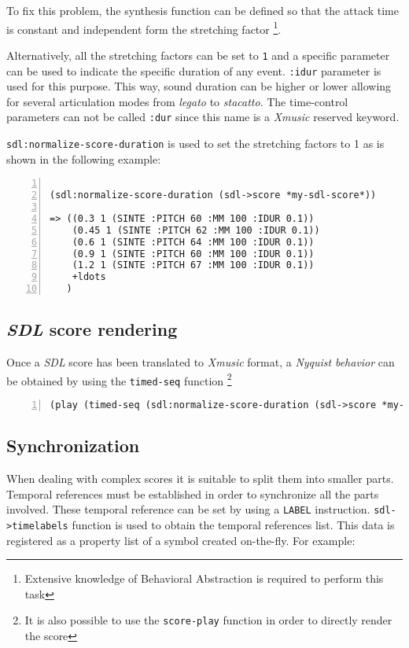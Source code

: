 To fix this problem, the synthesis function can be defined so that the
attack time is constant and independent form the stretching factor
\footnote{Extensive knowledge of Behavioral Abstraction is required to
  perform this task}.

Alternatively, all the stretching factors can be set to \texttt{1} and
a specific parameter can be used to indicate the specific duration of
any event. \texttt{:idur} parameter is used for this purpose. This
way, sound duration can be higher or lower allowing for several
articulation modes from {\it legato} to {\it stacatto}. The time-control
parameters can not be called \texttt{:dur} since this name is a {\it
  Xmusic} reserved keyword.




\texttt{sdl:normalize-score-duration} is used to set the stretching
factors to 1 as is shown in the following example:
\begin{Verbatim}[frame=single,fontsize=\small,numbers=left,numbersep=2mm,
                 commandchars=+\[\]]

(sdl:normalize-score-duration (sdl->score *my-sdl-score*))

=> ((0.3 1 (SINTE :PITCH 60 :MM 100 :IDUR 0.1))
    (0.45 1 (SINTE :PITCH 62 :MM 100 :IDUR 0.1))
    (0.6 1 (SINTE :PITCH 64 :MM 100 :IDUR 0.1))
    (0.9 1 (SINTE :PITCH 60 :MM 100 :IDUR 0.1))
    (1.2 1 (SINTE :PITCH 67 :MM 100 :IDUR 0.1))
    +ldots
   )
\end{Verbatim}
  
\subsection{\textit{SDL} score rendering}
Once a \textit{SDL} score has been translated to \textit{Xmusic}
format, a {\it Nyquist} {\it behavior} can be obtained by using the \texttt{timed-seq} function \footnote{It is also possible to use the \texttt{score-play} function in order to directly render the score}
\begin{Verbatim}[frame=single,fontsize=\small,numbers=left,numbersep=2mm]
(play (timed-seq (sdl:normalize-score-duration (sdl->score *my-sdl-score*))))
\end{Verbatim}


\subsection{Synchronization}

When dealing with complex scores it is suitable to split them into
smaller parts. Temporal references must be
established in order to synchronize all the parts involved. These
temporal reference can be set by using a \texttt{LABEL}
instruction. \texttt{sdl->timelabels} function is used to obtain the
temporal references list. This data is registered as a property list
of a symbol created on-the-fly. For example:

